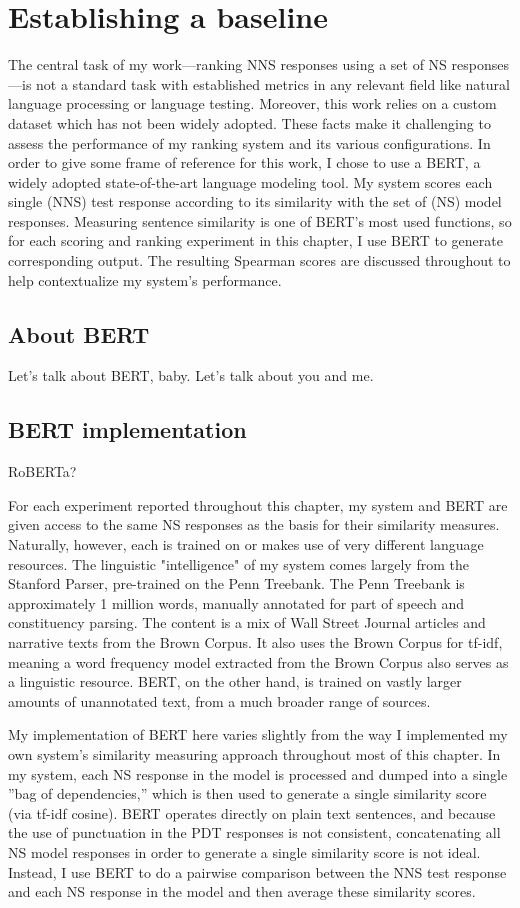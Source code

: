 \section{Establishing a baseline}
\label{sec:bert-baseline}
The central task of my work---ranking NNS responses using a set of NS responses---is not a standard task with established metrics in any relevant field like natural language processing or language testing. Moreover, this work relies on a custom dataset which has not been widely adopted. These facts make it challenging to assess the performance of my ranking system and its various configurations. In order to give some frame of reference for this work, I chose to use a BERT, a widely adopted state-of-the-art language modeling tool. My system scores each single (NNS) test response according to its similarity with the set of (NS) model responses. Measuring sentence similarity is one of BERT's most used functions, so for each scoring and ranking experiment in this chapter, I use BERT to generate corresponding output. The resulting Spearman scores are discussed throughout to help contextualize my system's performance.
\subsection{About BERT}
\label{sec:about-bert}
Let's talk about BERT, baby. Let's talk about you and me.

\subsection{BERT implementation}
RoBERTa?

For each experiment reported throughout this chapter, my system and BERT are given access to the same NS responses as the basis for their similarity measures. Naturally, however, each is trained on or makes use of very different language resources. The linguistic "intelligence" of my system comes largely from the Stanford Parser, pre-trained on the Penn Treebank. The Penn Treebank is approximately 1 million words, manually annotated for part of speech and constituency parsing. The content is a mix of Wall Street Journal articles and narrative texts from the Brown Corpus. It also uses the Brown Corpus for tf-idf, meaning a word frequency model extracted from the Brown Corpus also serves as a linguistic resource. BERT, on the other hand, is trained on vastly larger amounts of unannotated text, from a much broader range of sources.

My implementation of BERT here varies slightly from the way I implemented my own system's similarity measuring approach throughout most of this chapter. In my system, each NS response in the model is processed and dumped into a single ''bag of dependencies,'' which is then used to generate a single similarity score (via tf-idf cosine). BERT operates directly on plain text sentences, and because the use of punctuation in the PDT responses is not consistent, concatenating all NS model responses in order to generate a single similarity score is not ideal. Instead, I use BERT to do a pairwise comparison between the NNS test response and each NS response in the model and then average these similarity scores.

